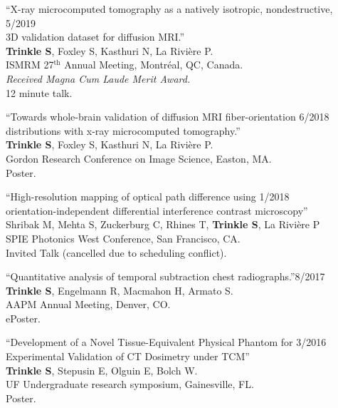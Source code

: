 \documentclass[10pt,letterpaper]{article}
\begin{document}
\begin{benumerate}{10}
\item{``X-ray microcomputed tomography as a natively isotropic, nondestructive, \hfill 5/2019\\
    3D validation dataset for diffusion MRI.''\\
    \textbf{Trinkle S}, Foxley S, Kasthuri N, La Rivière P.\\
    ISMRM 27$^{\text{th}}$ Annual Meeting, Montr\'eal, QC, Canada.\\
    \textit{Received Magna Cum Laude Merit Award.}\\
    12 minute talk.}
  
\item{``Towards whole-brain validation of diffusion MRI fiber-orientation \hfill 6/2018\\
    distributions with x-ray microcomputed tomography.''\\
    \textbf{Trinkle S}, Foxley S, Kasthuri N, La Rivière P.\\
    Gordon Research Conference on Image Science, Easton, MA. \\
    Poster.}

\item{``High-resolution mapping of optical path difference using \hfill 1/2018\\
    orientation-independent differential interference contrast microscopy'' \\
    Shribak M, Mehta S, Zuckerburg C, Rhines T, \textbf{Trinkle S}, La Rivi\`ere P\\
    SPIE Photonics West Conference, San Francisco, CA. \\
    Invited Talk (cancelled due to scheduling conflict).}
  
\item{``Quantitative analysis of temporal subtraction chest radiographs.''\hfill 8/2017\\
    \textbf{Trinkle S}, Engelmann R, Macmahon H, Armato S. \\
    AAPM Annual Meeting, Denver, CO. \\
    ePoster.}

\item{``Development of a Novel Tissue-Equivalent Physical Phantom for \hfill 3/2016\\
    Experimental Validation of CT Dosimetry under TCM'' \\
    \textbf{Trinkle S}, Stepusin E, Olguin E, Bolch W.\\
    UF Undergraduate research symposium, Gainesville, FL. \\
    Poster.}

\end{benumerate}
\end{document}
